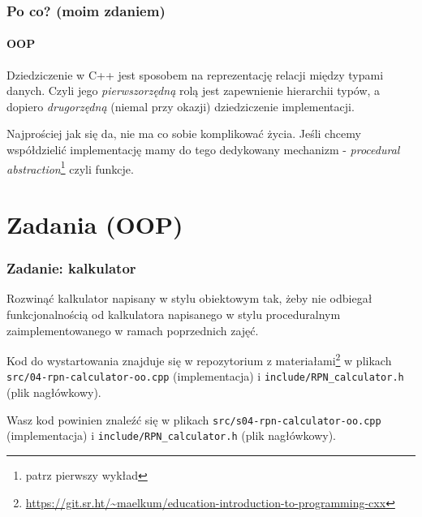 \documentclass[aspectratio=169,10pt]{beamer}
\begin{document}
\begin{frame}
    \frametitle{Po co? (moim zdaniem)}
    \framesubtitle{OOP}

    Dziedziczenie w C++ jest sposobem na reprezentację relacji między typami
    danych. Czyli jego \emph{pierwszorzędną} rolą jest zapewnienie hierarchii
    typów, a dopiero \emph{drugorzędną} (niemal przy okazji) dziedziczenie
    implementacji.



    \vspace{1em}

    Najprościej jak się da, nie ma co sobie komplikować życia. Jeśli chcemy
    współdzielić implementację mamy do tego dedykowany mechanizm -
    \emph{procedural abstraction}\footnote{patrz pierwszy wykład} czyli funkcje.
\end{frame}


\section{Zadania (OOP)}

\begin{frame}
    \frametitle{Zadanie: kalkulator}
    \label{lecture_exercise_5}

    Rozwinąć kalkulator napisany w stylu obiektowym tak, żeby nie odbiegał
    funkcjonalnością od kalkulatora napisanego w stylu proceduralnym
    zaimplementowanego w ramach poprzednich zajęć.

    Kod do wystartowania znajduje się w repozytorium z
    materiałami\footnote{\url{https://git.sr.ht/~maelkum/education-introduction-to-programming-cxx}}
    w plikach \texttt{src/04-rpn-calculator-oo.cpp} (implementacja) i
    \texttt{include/RPN\_calculator.h} (plik nagłówkowy).

    \vspace{1em}

    {\footnotesize
    Wasz kod powinien znaleźć się w plikach
    \texttt{src/s04-rpn-calculator-oo.cpp} (implementacja) i
    \texttt{include/RPN\_calculator.h} (plik nagłówkowy).}
\end{frame}
\end{document}
